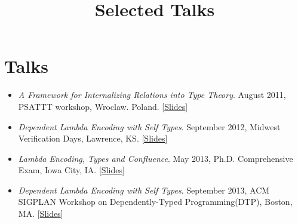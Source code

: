 \documentclass[10pt]{article}
\title{\bfseries\Large Selected Talks}
\date{}
\begin{document}
\maketitle
\vspace{-4em}

\vspace{20pt}
\section*{Talks}
\begin{itemize}

\item \textit{A Framework for Internalizing Relations into Type Theory}. August 2011, PSATTT workshop, Wroclaw. Poland. [\href{../../document/talks/psattt11-talk.pdf}{Slides}]
\item \textit{Dependent Lambda Encoding with Self Types}. September 2012, Midwest Verification Days, Lawrence, KS. [\href{../../document/talks/mvd-2012.pdf}{Slides}]
\item \textit{Lambda Encoding, Types and Confluence}. May 2013, Ph.D. Comprehensive Exam, Iowa City, IA. [\href{../../document/talks/comp.pdf}{Slides}]
\item \textit{Dependent Lambda Encoding with Self Types}. September 2013, ACM SIGPLAN Workshop on Dependently-Typed Programming(DTP), Boston, MA. [\href{../../document/talks/dtp-2013.pdf}{Slides}]
\end{itemize}
\end{document}
